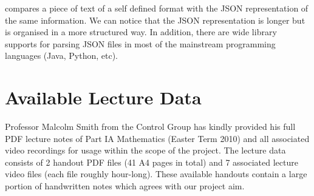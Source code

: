 compares a piece of text of a self defined format with the JSON representation of the same information. We can notice that the JSON representation is longer but is organised in a more structured way. In addition, there are wide library supports for parsing JSON files in most of the mainstream programming languages (Java, Python, etc).


\section{Available Lecture Data}

Professor Malcolm Smith from the Control Group has kindly provided his full PDF lecture notes of Part IA Mathematics (Easter Term 2010) and all associated video recordings for usage within the scope of the project. The lecture data consists of 2 handout PDF files (41 A4 pages in total) and 7 associated lecture video files (each file roughly hour-long). These available handouts contain a large portion of handwritten notes which agrees with our project aim.

